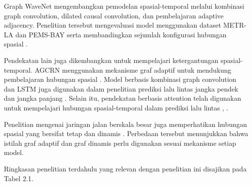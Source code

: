 Graph WaveNet mengembangkan pemodelan spasial-temporal melalui kombinasi graph convolution, dilated causal convolution, dan pembelajaran adaptive adjacency. Penelitian tersebut mengevaluasi model menggunakan dataset METR-LA dan PEMS-BAY serta membandingkan sejumlah konfigurasi hubungan spasial \cite{wu2019graphwavenet}.

Pendekatan lain juga dikembangkan untuk mempelajari ketergantungan spasial-temporal. AGCRN menggunakan mekanisme graf adaptif untuk mendukung pembelajaran hubungan spasial \cite{bai2020agcrn}. Model berbasis kombinasi graph convolution dan LSTM juga digunakan dalam penelitian prediksi lalu lintas jangka pendek dan jangka panjang \cite{bogaerts2020graphcnn}. Selain itu, pendekatan berbasis attention telah digunakan untuk mempelajari hubungan spasial-temporal dalam prediksi lalu lintas \cite{guo2019astgcn}, \cite{zheng2020gman}.

Penelitian mengenai jaringan jalan berskala besar juga memperhatikan hubungan spasial yang bersifat tetap dan dinamis \cite{zheng2022dynamic}. Perbedaan tersebut menunjukkan bahwa istilah graf adaptif dan graf dinamis perlu digunakan sesuai mekanisme setiap model.

Ringkasan penelitian terdahulu yang relevan dengan penelitian ini disajikan pada Tabel 2.1.

